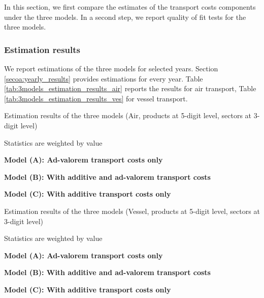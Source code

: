 \documentclass[11pt,twoside, authoryear]{elsarticle}
\begin{document}
In this section, we first compare the estimates of the transport costs components under the three models. In a second step, we report quality of fit tests for the three models.

\subsubsection{Estimation results}

We report estimations of the three models for selected years. Section \ref{secoa:yearly_results} provides estimations for every year. Table \ref{tab:3models_estimation_results_air} reports the results for air transport, Table \ref{tab:3models_estimation_results_ves} for vessel transport.

\setcounter{table}{0}
\renewcommand{\thetable}{A.\arabic{table}}


\begin{table}[htbp]
	\centering
	\footnotesize{
	\caption{Estimation results of the three models (Air, products at 5-digit level, sectors at 3-digit level)}
	\label{tab:3models_estimation_results_air}%
	
   \begin{tablenotes}
	\tiny
	\item Statistics are weighted by value
	\item \textbf{Model (A): Ad-valorem transport costs only}
	\item \textbf{Model (B): With additive and ad-valorem transport costs}
				\item \textbf{Model (C): With additive transport costs only}
\end{tablenotes}

}	
\end{table}%


\begin{table}[htbp]
	\centering
	\footnotesize{
		\caption{Estimation results of the three models (Vessel, products at 5-digit level, sectors at 3-digit level)}
		\label{tab:3models_estimation_results_ves}%
		
		\begin{tablenotes}
			\tiny
		\item Statistics are weighted by value
		\item \textbf{Model (A): Ad-valorem transport costs only}
		\item \textbf{Model (B): With additive and ad-valorem transport costs}
		\item \textbf{Model (C): With additive transport costs only}
		\end{tablenotes}
   }
\end{table}%
\end{document}
